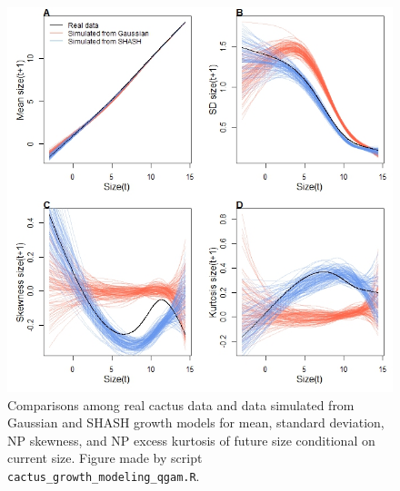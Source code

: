 \documentclass[12pt]{article}
\begin{document}
\begin{figure}[tbp]
	\centering
	\includegraphics[width=1.0\textwidth]{figures/cactus_SHASH_fit.jpg}
	\caption{Comparisons among real cactus data and data simulated from Gaussian and SHASH growth models for mean, standard deviation, NP skewness, and NP excess kurtosis of future size conditional on current size. Figure made by script \texttt{cactus\_growth\_modeling\_qgam.R}.}
	\label{fig:cactus_fit}
\end{figure} 
\end{document}
